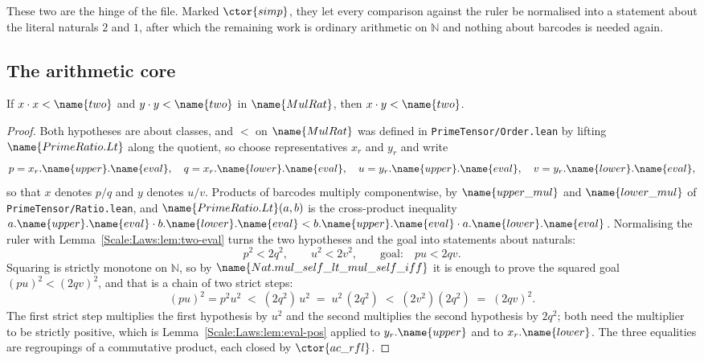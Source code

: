These two are the hinge of the file.  Marked $\ctor{simp}$, they let every
comparison against the ruler be normalised into a statement about the literal
naturals $2$ and $1$, after which the remaining work is ordinary arithmetic on
$\mathbb{N}$ and nothing about barcodes is needed again.

\subsection{The arithmetic core}

\begin{theorem}
\label{Scale:Laws:thm:mul-lt-two}
If $x \cdot x < \name{two}$ and $y \cdot y < \name{two}$ in $\name{MulRat}$,
then $x \cdot y < \name{two}$.
\end{theorem}

\begin{proof}
Both hypotheses are about classes, and $<$ on $\name{MulRat}$ was defined in
\texttt{PrimeTensor/Order.lean} by lifting $\name{PrimeRatio.Lt}$ along the
quotient, so choose representatives $x_r$ and $y_r$ and write
\[
  p = x_r.\name{upper}.\name{eval}, \quad
  q = x_r.\name{lower}.\name{eval}, \quad
  u = y_r.\name{upper}.\name{eval}, \quad
  v = y_r.\name{lower}.\name{eval},
\]
so that $x$ denotes $p/q$ and $y$ denotes $u/v$.  Products of barcodes
multiply componentwise, by $\name{upper\_mul}$ and $\name{lower\_mul}$ of
\texttt{PrimeTensor/Ratio.lean}, and
$\name{PrimeRatio.Lt}(a,b)$ is the cross-product inequality
$a.\name{upper}.\name{eval} \cdot b.\name{lower}.\name{eval} <
 b.\name{upper}.\name{eval} \cdot a.\name{lower}.\name{eval}$.  Normalising
the ruler with Lemma~\ref{Scale:Laws:lem:two-eval} turns the two hypotheses
and the goal into statements about naturals:
\[
  p^2 < 2q^2, \qquad u^2 < 2v^2, \qquad\text{goal:}\quad pu < 2qv .
\]
Squaring is strictly monotone on $\mathbb{N}$, so by
$\name{Nat.mul\_self\_lt\_mul\_self\_iff}$ it is enough to prove the squared
goal $(pu)^2 < (2qv)^2$, and that is a chain of two strict steps:
\[
  (pu)^2 = p^2 u^2
    \;<\; (2q^2)\,u^2
    \;=\; u^2\,(2q^2)
    \;<\; (2v^2)(2q^2)
    \;=\; (2qv)^2 .
\]
The first strict step multiplies the first hypothesis by $u^2$ and the second
multiplies the second hypothesis by $2q^2$; both need the multiplier to be
strictly positive, which is Lemma~\ref{Scale:Laws:lem:eval-pos} applied to
$y_r.\name{upper}$ and to $x_r.\name{lower}$.  The three equalities are
regroupings of a commutative product, each closed by $\ctor{ac\_rfl}$.
\end{proof}

